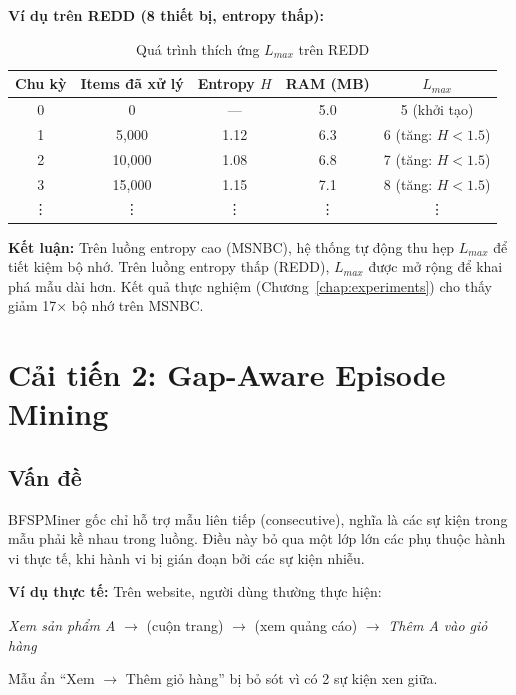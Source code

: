 \documentclass[a4paper,12pt]{report}
\begin{document}
\textbf{Ví dụ trên REDD (8 thiết bị, entropy thấp):}

\begin{table}[H]
    \centering
    \caption{Quá trình thích ứng $L_{max}$ trên REDD}
    \label{tab:adaptive_redd}
    \begin{tabular}{ccccc}
        \toprule
        \textbf{Chu kỳ} & \textbf{Items đã xử lý} & \textbf{Entropy $H$} & \textbf{RAM (MB)} & $L_{max}$ \\
        \midrule
        0  & 0      & ---   & 5.0   & 5 (khởi tạo) \\
        1  & 5,000  & 1.12  & 6.3   & 6 (tăng: $H < 1.5$) \\
        2  & 10,000 & 1.08  & 6.8   & 7 (tăng: $H < 1.5$) \\
        3  & 15,000 & 1.15  & 7.1   & 8 (tăng: $H < 1.5$) \\
        \vdots & \vdots & \vdots & \vdots & \vdots \\
        \bottomrule
    \end{tabular}
\end{table}

\textbf{Kết luận:} Trên luồng entropy cao (MSNBC), hệ thống tự động thu hẹp $L_{max}$ để tiết kiệm bộ nhớ. Trên luồng entropy thấp (REDD), $L_{max}$ được mở rộng để khai phá mẫu dài hơn. Kết quả thực nghiệm (Chương~\ref{chap:experiments}) cho thấy giảm 17× bộ nhớ trên MSNBC.

\section{Cải tiến 2: Gap-Aware Episode Mining}
\label{sec:gap}

\subsection{Vấn đề}
BFSPMiner gốc chỉ hỗ trợ mẫu liên tiếp (consecutive), nghĩa là các sự kiện trong mẫu phải kề nhau trong luồng. Điều này bỏ qua một lớp lớn các phụ thuộc hành vi thực tế, khi hành vi bị gián đoạn bởi các sự kiện nhiễu.

\textbf{Ví dụ thực tế:} Trên website, người dùng thường thực hiện:
\begin{center}
    \textit{Xem sản phẩm A} $\rightarrow$ (cuộn trang) $\rightarrow$ (xem quảng cáo) $\rightarrow$ \textit{Thêm A vào giỏ hàng}
\end{center}
Mẫu ẩn ``Xem $\rightarrow$ Thêm giỏ hàng'' bị bỏ sót vì có 2 sự kiện xen giữa.
\end{document}
